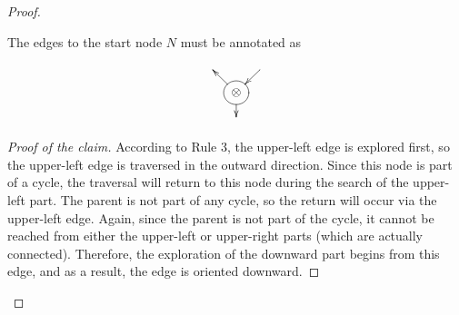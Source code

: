 \begin{proof}
    \begin{claim*}
        The edges to the start node \( N \) must be annotated as
        \begin{gather*}
            \xymatrix@C=3mm@R=3mm{
                &  & \ar[ld] \\
                &
                *++[o][F-]{\otimes} \ar[ul] \ar[d] &
                \\
                & &
            }
        \end{gather*}
    \end{claim*}
    \begin{proof}[Proof of the claim]\renewcommand{\qedsymbol}{$\blacksquare$}
        According to Rule 3, the upper-left edge is explored first, so the upper-left edge is traversed in the outward direction.
        Since this node is part of a cycle, the traversal will return to this node during the search of the upper-left part.
        The parent is not part of any cycle, so the return will occur via the upper-left edge.
        Again, since the parent is not part of the cycle, it cannot be reached from either the upper-left or upper-right parts (which are actually connected).
        Therefore, the exploration of the downward part begins from this edge, and as a result, the edge is oriented downward.
    \end{proof}


\end{proof}
